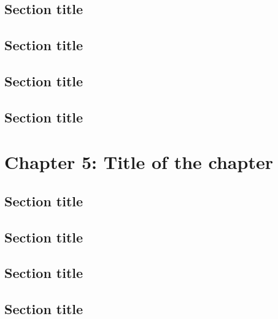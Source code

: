\documentclass[
]{article}
\begin{document}
\hypertarget{section-title-9}{%
\subsection{Section title}\label{section-title-9}}

\hypertarget{section-title-10}{%
\subsection{Section title}\label{section-title-10}}

\hypertarget{section-title-11}{%
\subsection{Section title}\label{section-title-11}}

\hypertarget{section-title-12}{%
\subsection{Section title}\label{section-title-12}}

\pagebreak

\hypertarget{chapter-5-title-of-the-chapter}{%
\section{Chapter 5: Title of the chapter}\label{chapter-5-title-of-the-chapter}}

\hypertarget{section-title-13}{%
\subsection{Section title}\label{section-title-13}}

\hypertarget{section-title-14}{%
\subsection{Section title}\label{section-title-14}}

\hypertarget{section-title-15}{%
\subsection{Section title}\label{section-title-15}}

\hypertarget{section-title-16}{%
\subsection{Section title}\label{section-title-16}}
\end{document}
